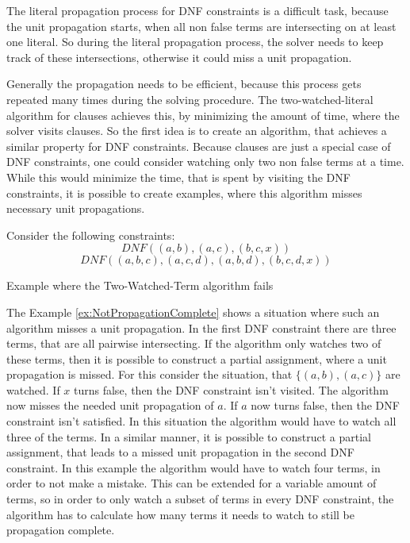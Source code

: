 The literal propagation process for DNF constraints is a difficult task, because the unit propagation starts, when all non false terms are intersecting on at least one literal. So during the literal propagation process, the solver needs to keep track of these intersections, otherwise it could miss a unit propagation. 

Generally the propagation needs to be efficient, because this process gets repeated many times during the solving procedure. The two-watched-literal algorithm for clauses achieves this, by minimizing the amount of time, where the solver visits clauses. So the first idea is to create an algorithm, that achieves a similar property for DNF constraints. Because clauses are just a special case of DNF constraints, one could consider watching only two non false terms at a time. While this would minimize the time, that is spent by visiting the DNF constraints, it is possible to create examples, where this algorithm misses necessary unit propagations.

\begin{example}[!htb]
\begin{leftbar}
Consider the following constraints:
\begin{displaymath}
DNF ((a,b),(a,c),(b,c,x))
\end{displaymath}
\begin{displaymath}
DNF ((a,b,c),(a,c,d),(a,b,d),(b,c,d,x))
\end{displaymath}
\end{leftbar}
\caption{Example where the Two-Watched-Term algorithm fails}
\label{ex:NotPropagationComplete}
\end{example}

The Example \ref{ex:NotPropagationComplete} shows a situation where such an algorithm misses a unit propagation. In the first DNF constraint there are three terms, that are all pairwise intersecting. If the algorithm only watches two of these terms, then it is possible to construct a partial assignment, where a unit propagation is missed. For this consider the situation, that $\{(a,b),(a,c)\}$ are watched. If $x$ turns false, then the DNF constraint isn't visited. The algorithm now misses the needed unit propagation of $a$. If $a$ now turns false, then the DNF constraint isn't satisfied. In this situation the algorithm would have to watch all three of the terms.
In a similar manner, it is possible to construct a partial assignment, that leads to a missed unit propagation in the second DNF constraint. In this example the algorithm would have to watch four terms, in order to not make a mistake. This can be extended for a variable amount of terms, so in order to only watch a subset of terms in every DNF constraint, the algorithm has to calculate how many terms it needs to watch to still be propagation complete. 


